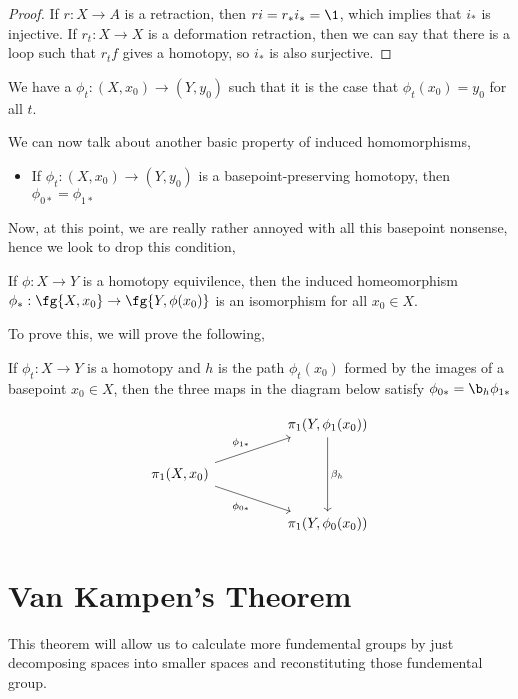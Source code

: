 \begin{proof}
  If $r : X \to A$ is a retraction, then $ri = r_*i_* = \1$, which implies that $i_*$ is injective. If $r_t : X \to X$ is a deformation retraction, then we can say that there is a loop such that $r_t f$ gives a homotopy, so $i_*$ is also surjective.
\end{proof}

\begin{ndefi}
  We have a $\phi_t : (X, x_0) \to (Y, y_0)$ such that it is the case that $\phi_t (x_0) = y_0$ for all $t$.
\end{ndefi}

\begin{pprop}
  We can now talk about another basic property of induced homomorphisms,
  \begin{itemize}
    \item If $\phi_t : (X, x_0) \to (Y, y_0)$ is a basepoint-preserving homotopy, then $\phi_{0*} = \phi_{1*}$
  \end{itemize}
\end{pprop}

Now, at this point, we are really rather annoyed with all this basepoint nonsense, hence we look to drop this condition,

\begin{nprop}
  If $\phi : X\to Y$ is a homotopy equivilence, then the induced homeomorphism $\phi_* : \fg { X, x_0} \to \fg {Y, \phi (x_0)}$ is an isomorphism for all $x_0 \in X$.
\end{nprop}
To prove this, we will prove the following,
\begin{nlemma}[]
  If $\phi_t : X \to Y$ is a homotopy and $h$ is the path $\phi_t(x_0)$ formed by the images of a basepoint $x_0\in X$, then the three maps in the diagram below satisfy $\phi_{0*} = \b_h \phi_{1*}$
\end{nlemma}

\[\begin{tikzcd}
	&& {\pi_1 (Y, \phi_1(x_0))} \\
	{\pi_1 (X, x_0)} \\
	&& {\pi_1 (Y, \phi_0(x_0))}
	\arrow["{\phi_{1*}}", from=2-1, to=1-3]
	\arrow["{\phi_{0*}}"', from=2-1, to=3-3]
	\arrow["{\beta_h}", from=1-3, to=3-3]
\end{tikzcd}\]

\section{Van Kampen's Theorem}
This theorem will allow us to calculate more fundemental groups by just decomposing spaces into smaller spaces and reconstituting those fundemental group. \\


